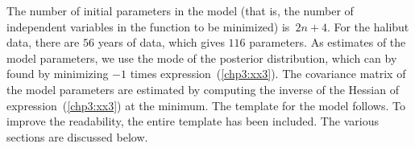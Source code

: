 \documentclass{admbmanual}
\begin{document}
The number of initial parameters in the model (that is, the number of
independent variables in the function to be minimized) is~$2n+4$. For the
halibut data, there are $56$ years of data, which gives $116$ parameters. As
estimates of the model parameters, we use the mode of the posterior
distribution, which can by found by minimizing $-1$ times
expression~(\ref{chp3:xx3}). %
The covariance matrix of the model parameters are estimated by computing the
inverse of the Hessian of expression~(\ref{chp3:xx3}) %
at the minimum. The template for the model follows. To improve the readability,
the entire template has been included. The various sections are discussed below.
\end{document}
